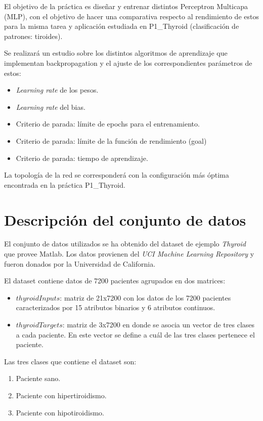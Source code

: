 \documentclass[a4paper,12pt,titlepage]{article}
\begin{document}
El objetivo de la práctica es diseñar y entrenar distintos Perceptron Multicapa (MLP), con el objetivo de hacer una comparativa respecto al rendimiento de estos para la misma tarea y aplicación estudiada en P1\_Thyroid (clasificación de patrones: tiroides).

Se realizará un estudio sobre los distintos algoritmos de aprendizaje que
implementan backpropagation y el ajuste de los correspondientes parámetros de estos:

\begin{itemize}[noitemsep]
	\item \textit{Learning rate} de los pesos.
	\item \textit{Learning rate} del bias.
	\item Criterio de parada: límite de epochs para el entrenamiento.
	\item Criterio de parada: límite de la función de rendimiento (goal)
	\item Criterio de parada: tiempo de aprendizaje.
\end{itemize}

La topología de la red se corresponderá con la configuración más óptima encontrada en la práctica P1\_Thyroid.

\section{Descripción del conjunto de datos}

El conjunto de datos utilizados se ha obtenido del dataset de ejemplo \emph{Thyroid} que provee Matlab. Los datos provienen del \emph{UCI Machine Learning Repository} \citep{Asuncion+Newman:2007} y fueron donados por la Universidad de California.

El dataset contiene datos de 7200 pacientes agrupados en dos matrices:

\begin{itemize}[noitemsep]
	\item $thyroidInputs$: matriz de 21x7200 con los datos de los 7200 pacientes caracterizados por 15 atributos binarios y 6 atributos continuos.
	\item $thyroidTargets$: matriz de 3x7200 en donde se asocia un vector de tres clases a cada paciente. En este vector se define a cuál de las tres clases pertenece el paciente.
\end{itemize}

Las tres clases que contiene el dataset son:

\begin{enumerate}[noitemsep]
	\item Paciente sano.
	\item Paciente con hipertiroidismo.
	\item Paciente con hipotiroidismo.
\end{enumerate}
\end{document}
